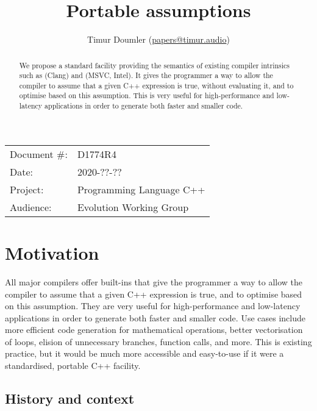

\newcommand{\forceindent}{\parindent=1em\indent\parindent=0pt\relax} %


\title{Portable assumptions}
\author{
  Timur Doumler \small(\href{mailto:papers@timur.audio}{papers@timur.audio})
}
\date{}
\maketitle

\begin{tabular}{ll}
Document \#: & D1774R4 \\
Date: & 2020-??-??\\
Project: & Programming Language C++ \\
Audience: & Evolution Working Group
\end{tabular}


\begin{abstract}
We propose a standard facility providing the semantics of existing compiler intrinsics such as  (Clang) and  (MSVC, Intel). It gives the programmer a way to allow the compiler to assume that a given C++ expression is true, without evaluating it, and to optimise based on this assumption. This is very useful for high-performance and low-latency applications in order to generate both faster and smaller code.
\end{abstract}

\vspace{5mm}

\section{Motivation}

All major compilers offer built-ins that give the programmer a way to allow the compiler to assume that a given C++ expression is true, and to optimise based on this assumption. They are very useful for high-performance and low-latency applications in order to generate both faster and smaller code. Use cases include more efficient code generation for mathematical operations, better vectorisation of loops, elision of unnecessary branches, function calls, and more. This is existing practice, but it would be much more accessible and easy-to-use if it were a standardised, portable C++ facility.

\subsection{History and context}

